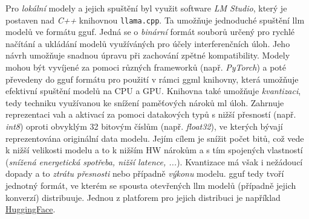 \documentclass[czech, ma, kiv, he, iso690alph, pdf, viewonly]{fasthesis}
\begin{document}
            Pro \emph{lokální} modely a jejich spuštění byl využit software \textit{LM Studio}, který je postaven nad \textit{C++} knihovnou \verb|llama.cpp|. Ta umožňuje jednoduché spuštění \Gls{llm} modelů ve formátu \acrfull{gguf}. Jedná se o \textit{binární} formát souborů určený pro rychlé načítání a ukládání modelů využíváných pro účely interferenčních úloh. Jeho návrh umožňuje snadnou úpravu při zachování zpětné kompatibility. \cite{ggerganov_gguf} \cite{huggingface_gguf} Modely mohou být vyvíjené za pomoci různých frameworků (např. \textit{PyTorch}) a poté převedeny do \acrshort{gguf} formátu pro použití v rámci \acrshort{ggml} knihovny, která umožňuje efektivní spuštění modelů na CPU a GPU. Knihovna také umožňuje \emph{kvantizaci}, tedy techniku využívanou ke snížení paměťových nároků \acrshort{ml} úloh. Zahrnuje reprezentaci vah a aktivací za pomoci datakových typů s nižší přesností (např. \textit{int8}) oproti obvyklým 32 bitovým číslům (např. \textit{float32}), ve kterých bývají reprezentována originální data modelu. Jejím cílem je snížit počet bitů, což vede k nižší velikosti modelu a to k nižším HW nárokům a s tím spojených vlastností (\textit{snížená energetická spotřeba, nižší latence, ...}). Kvantizace má však i nežádoucí dopady a to \textit{ztrátu přesnosti} nebo případně \textit{výkonu} modelu. \cite{huggingface_quantization} \Acrshort{gguf} tedy tvoří jednotný formát, ve kterém se spousta otevřených \Gls{llm} modelů (případně jejich konverzí) distribuuje. Jednou z platforem pro jejich distribuci je například \href{https://huggingface.co}{HuggingFace}.

\end{document}
